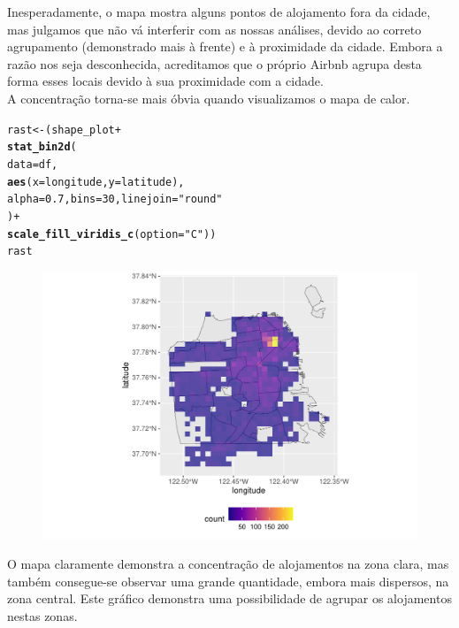 \documentclass[justified, 11pt]{scrartcl}\usepackage[]{graphicx}\usepackage[]{xcolor}
\makeatletter
\def\maxwidth{ %
  \ifdim\Gin@nat@width>\linewidth
    \linewidth
  \else
    \Gin@nat@width
  \fi
}
\newcommand{\hlnum}[1]{\textcolor[rgb]{0.686,0.059,0.569}{#1}}%
\newcommand{\hlstr}[1]{\textcolor[rgb]{0.192,0.494,0.8}{#1}}%
\newcommand{\hlopt}[1]{\textcolor[rgb]{0,0,0}{#1}}%
\newcommand{\hlstd}[1]{\textcolor[rgb]{0.345,0.345,0.345}{#1}}%
\newcommand{\hlkwb}[1]{\textcolor[rgb]{0.69,0.353,0.396}{#1}}%
\newcommand{\hlkwc}[1]{\textcolor[rgb]{0.333,0.667,0.333}{#1}}%
\newcommand{\hlkwd}[1]{\textcolor[rgb]{0.737,0.353,0.396}{\textbf{#1}}}%
\newenvironment{kframe}{%
 \def\at@end@of@kframe{}%
 \ifinner\ifhmode%
  \def\at@end@of@kframe{\end{minipage}}%
  \begin{minipage}{\columnwidth}%
 \fi\fi%
 \def\FrameCommand##1{\hskip\@totalleftmargin \hskip-\fboxsep
 \colorbox{shadecolor}{##1}\hskip-\fboxsep
     \hskip-\linewidth \hskip-\@totalleftmargin \hskip\columnwidth}%
 \MakeFramed {\advance\hsize-\width
   \@totalleftmargin\z@ \linewidth\hsize
   \@setminipage}}%
 {\par\unskip\endMakeFramed%
 \at@end@of@kframe}
\newenvironment{knitrout}{}{} %
\makeatother
\begin{document}
Inesperadamente, o mapa mostra alguns pontos de alojamento fora da cidade, mas julgamos que não vá interferir com as nossas análises, devido ao correto agrupamento (demonstrado mais à frente) e à proximidade da cidade. Embora a razão nos seja desconhecida, acreditamos que o próprio Airbnb agrupa desta forma esses locais devido à sua proximidade com a cidade. \\
A concentração torna-se mais óbvia quando visualizamos o mapa de calor.
\begin{knitrout}
\color{fgcolor}\begin{kframe}
\begin{alltt}
\hlstd{rast} \hlkwb{<-} \hlstd{(shape_plot} \hlopt{+}
  \hlkwd{stat_bin2d}\hlstd{(}
    \hlkwc{data}\hlstd{=df,}
    \hlkwd{aes}\hlstd{(}\hlkwc{x}\hlstd{=longitude,} \hlkwc{y}\hlstd{=latitude),}
    \hlkwc{alpha}\hlstd{=}\hlnum{0.7}\hlstd{,} \hlkwc{bins} \hlstd{=} \hlnum{30}\hlstd{,} \hlkwc{linejoin}\hlstd{=}\hlstr{"round"}
  \hlstd{)} \hlopt{+}
  \hlkwd{scale_fill_viridis_c}\hlstd{(}\hlkwc{option}\hlstd{=}\hlstr{"C"}\hlstd{))}
\hlstd{rast}
\end{alltt}
\end{kframe}\begin{figure}
\includegraphics[width=\maxwidth]{figure/chunk-rasterPlaces-1} \end{figure}

\end{knitrout}
O mapa claramente demonstra a concentração de alojamentos na zona clara, mas também consegue-se observar uma grande quantidade, embora mais dispersos, na zona central. Este gráfico demonstra uma possibilidade de agrupar os alojamentos nestas zonas.
\end{document}
